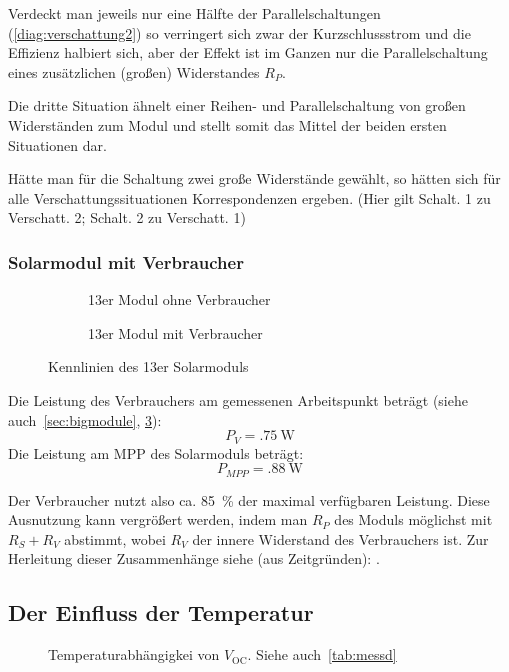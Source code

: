 \documentclass[slug=SZ, room=Hermann-Krone-Bau\,\ Labor\ 1.25,
supervisor=Martin\ Kroll, coursedate=14.\ 11.\ 2019]{../../Lab_Report_LaTeX/lab_report}
\newcommand{\voc}{V_{\text{OC}}}
\begin{document}
Verdeckt man jeweils nur eine H\"alfte der Parallelschaltungen
(\ref{diag:verschattung2}) so verringert sich zwar der
Kurzschlussstrom und die Effizienz halbiert sich, aber der Effekt ist
im Ganzen nur die Parallelschaltung eines zus\"atzlichen (großen)
Widerstandes \(R_P\).

Die dritte Situation \"ahnelt einer Reihen- und Parallelschaltung von
gro\ss{}en Widerst\"anden zum Modul und stellt somit das Mittel der
beiden ersten Situationen dar.

H\"atte man f\"ur die Schaltung zwei gro\ss{}e Widerst\"ande gew\"ahlt, so
h\"atten sich f\"ur alle Verschattungssituationen Korrespondenzen
ergeben. (Hier gilt Schalt. 1 zu Verschatt. 2; Schalt. 2 zu Verschatt. 1)

\subsubsection{Solarmodul mit Verbraucher}
\label{sec:analyseverbr}
\begin{figure}[H]\centering
  \begin{subfigure}[b]{1\textwidth}\centering
    
    \caption{13er Modul ohne Verbraucher}
    \label{diag:hugehellrs}
  \end{subfigure}
  \begin{subfigure}[b]{1\textwidth}\centering
    
    \caption{13er Modul mit Verbraucher}
    \label{diag:hugeverbrrsrp}
  \end{subfigure}
  \caption{Kennlinien des 13er Solarmoduls}
  \label{fig:huge}
\end{figure}

Die Leistung des Verbrauchers am gemessenen Arbeitspunkt betr\"agt
(siehe auch~\ref{sec:bigmodule},
\ref{fig:huge}): \[P_V=\SI{.75}{\watt}\] Die Leistung am MPP des
Solarmoduls betr\"agt: \[P_{MPP}=\SI{.88}{\watt}\]

Der Verbraucher nutzt also ca. \SI{85}{\percent} der maximal
verf\"ugbaren Leistung. Diese Ausnutzung kann vergrößert werden, indem
man \(R_P\) des Moduls m\"oglichst mit \(R_S+R_V\) abstimmt, wobei
\(R_V\) der innere Widerstand des Verbrauchers ist. Zur Herleitung
dieser Zusammenh\"ange siehe (aus Zeitgr\"unden):
\cite[154]{Demtröder2018}.

\subsection{Der Einfluss der Temperatur}
\label{sec:analysetemp}
\begin{figure}[H]\centering
        
        \caption{Temperaturabh\"angigkei von \(\voc\). Siehe auch~\ref{tab:messd}}
        \label{fig:tempeinf}
\end{figure}
\end{document}
